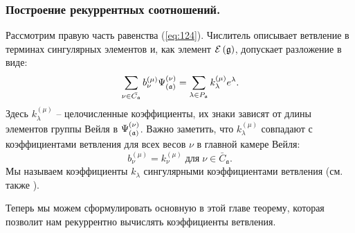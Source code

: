 \subsubsection{Построение рекуррентных соотношений.}
\label{subsec:Construct-recurrent-rel}

Рассмотрим правую часть равенства (\ref{eq:124}).
Числитель описывает ветвление в терминах сингулярных элементов и, как элемент  $\mathcal{E}\left( \mathfrak{g} \right)$, допускает разложение в виде:
\begin{equation}
  \label{eq:21}
  \sum_{\nu \in \bar{C_{\mathfrak{a}}}}b_{\nu }^{\left( \mu \right) }\Psi _{\left( \frak{%
        a}\right) }^{\left( \nu \right) }=\sum_{\lambda \in P_{\af}}k_{\lambda
  }^{\left( \mu \right) }e^{\lambda }.
\end{equation}
Здесь $k_{\lambda}^{\left( \mu \right) }$  -- целочисленные коэффициенты, их знаки зависят от длины элементов группы Вейля в 
$\Psi _{\left( \mathfrak{a}\right) }^{\left( \nu \right) }$. Важно заметить, что $k_{\lambda}^{\left( \mu \right) }$ совпадают с коэффициентами ветвления для всех весов $\nu$ в главной камере Вейля:
\begin{equation}
  \label{eq:119}
  b^{(\mu)}_{\nu}=k^{(\mu)}_{\nu} \; \mbox{для} \; \nu\in \bar{C}_{\mathfrak{a}}.
\end{equation}
Мы называем коэффициенты $k_{\lambda}$ сингулярными коэффициентами ветвления
(см. также \cite{ilyin812pbc}).

Теперь мы можем сформулировать основную в этой главе теорему, которая позволит нам рекуррентно вычислять коэффициенты ветвления.

